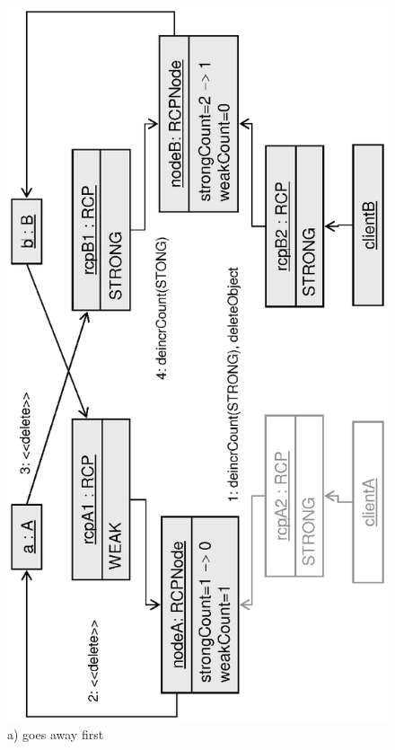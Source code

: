\documentclass[pdf,ps2pdf,11pt]{SANDreport}
\begin{document}
{\bsinglespace
\begin{figure}
\begin{center}
\includegraphics*[angle=270,scale=0.65]{CircularRCP_A_B_ClientA_1}
\\[2ex] a) {} goes away first \\[3ex]

\end{center}
\end{figure}}
\end{document}
